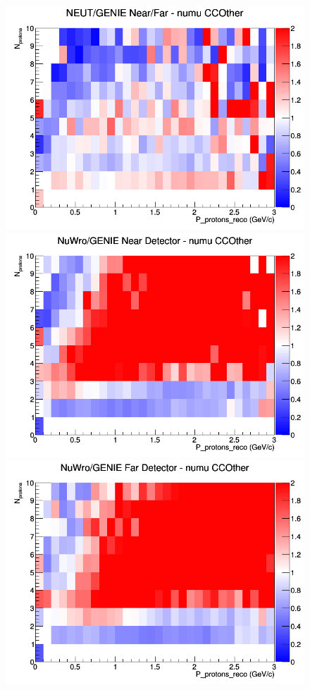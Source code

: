 \documentclass[12pt]{article}
\begin{document}
\begin{figure}[h]
\endminipage
{}
\includegraphics[width=\linewidth]{eff_N_P/GAr/protons/ratios/CCOther_NEUT_GENIE_numu_NF_N_P.png}
\endminipage
\newline
{}
\includegraphics[width=\linewidth]{eff_N_P/GAr/protons/ratios/CCOther_NuWro_GENIE_numu_near_N_P.png}
\endminipage
{}
\includegraphics[width=\linewidth]{eff_N_P/GAr/protons/ratios/CCOther_NuWro_GENIE_numu_far_N_P.png}

\end{figure}
\end{document}
